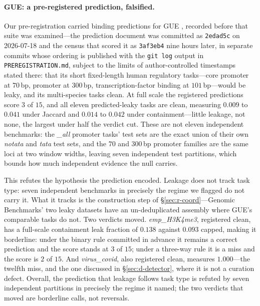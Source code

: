 \documentclass[webpdf,modern,large,namedate]{oup-authoring-template}%
\begin{document}
\paragraph{GUE: a pre-registered prediction, falsified.}\label{sec:r-gue} Our pre-registration carried binding predictions for GUE \citep{zhou2023dnabert2}, recorded before that suite was examined---the prediction document was committed as \texttt{2edad5c} on 2026-07-18 and the census that scored it as \texttt{3af3eb4} nine hours later, in separate commits whose ordering is published with the \texttt{git log} output in \texttt{PREREGISTRATION.md}, subject to the limits of author-controlled timestamps stated there: that its short fixed-length human regulatory tasks---core promoter at $70$\,bp, promoter at $300$\,bp, transcription-factor binding at $101$\,bp---would be leaky, and its multi-species tasks clean. At full scale the registered predictions score $3$ of $15$, and all eleven predicted-leaky tasks are clean, measuring $0.009$ to $0.041$ under Jaccard and $0.014$ to $0.042$ under containment---little leakage, not none, the largest under half the verdict cut. These are not eleven independent benchmarks: the \textit{\_all} promoter tasks' test sets are the exact union of their own \textit{notata} and \textit{tata} test sets, and the $70$ and $300$\,bp promoter families are the same loci at two window widths, leaving seven independent test partitions, which bounds how much independent evidence the null carries.

This refutes the hypothesis the prediction encoded. Leakage does not track task type: seven independent benchmarks in precisely the regime we flagged do not carry it. What it tracks is the construction step of \S\ref{sec:r-coord}---Genomic Benchmarks' two leaky datasets have an un-deduplicated assembly where GUE's comparable tasks do not. Two verdicts moved. \textit{emp\_H3K4me3}, registered clean, has a full-scale containment leak fraction of $0.138$ against $0.093$ capped, making it borderline: under the binary rule committed in advance it remains a correct prediction and the score stands at $3$ of $15$; under a three-way rule it is a miss and the score is $2$ of $15$. And \textit{virus\_covid}, also registered clean, measures $1.000$---the twelfth miss, and the one discussed in \S\ref{sec:d-detector}, where it is not a curation defect. Overall, the prediction that leakage follows task type is refuted by seven independent partitions in precisely the regime it named; the two verdicts that moved are borderline calls, not reversals.
\end{document}
